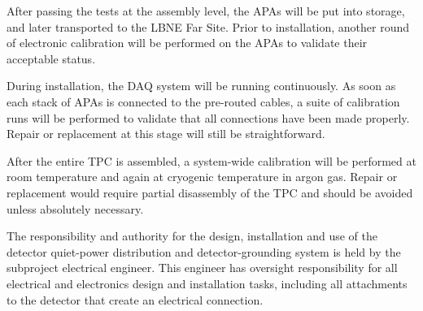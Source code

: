 After passing the tests at the assembly level, the APAs will be put into storage, and later transported to the LBNE Far Site. Prior to installation, another round of electronic calibration will be performed on the APAs to validate their acceptable status. 

During installation, the DAQ system will be running continuously. As soon as each stack of APAs is connected to the pre-routed cables, a suite of calibration runs will be performed to validate that all connections have been made properly. Repair or replacement at this stage will still be straightforward. 

After the entire TPC is assembled, a system-wide calibration will be performed at room temperature and again at cryogenic temperature in argon gas. Repair or replacement would require partial disassembly of the TPC and should be avoided unless absolutely necessary. 

The responsibility and authority for the design, installation and use of the detector quiet-power distribution and detector-grounding system is held by the subproject electrical engineer. This engineer has oversight responsibility for all electrical and electronics design and installation tasks, including all attachments to the detector that create an electrical connection. 



